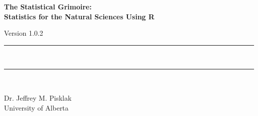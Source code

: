 {}
{
\Huge\bfseries\centering\headingfont The Statistical Grimoire: \\
Statistics for the Natural Sciences Using R\\

\vspace{0.5em}

\small\mdseries\raggedright Version 1.0.2

\rule{\linewidth}{1pt}\\[-6mm]
\rule{\linewidth}{2pt}\\

}

\vskip 2cm

\begin{center}
\Large Dr. Jeffrey M. Pisklak \\
\vspace{0.5em}
\large University of Alberta
\end{center}

\vfill

